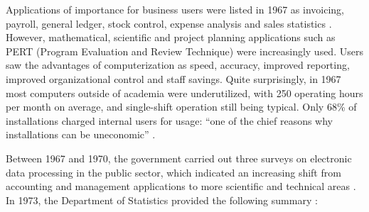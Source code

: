 \documentclass{IEEEcsmag}
\begin{document}
Applications of importance for business users were listed in 1967 as invoicing, payroll, general ledger, stock control, expense analysis and sales statistics \cite{ScottSurvey1967}. However, mathematical, scientific and project planning applications such as PERT (Program Evaluation and Review Technique) were increasingly used. Users saw the advantages of computerization as speed, accuracy, improved reporting, improved organizational control and staff savings. Quite surprisingly, in 1967 most computers outside of academia were underutilized, with 250 operating hours per month on average, and single-shift operation still being typical. Only 68\% of installations charged internal users for usage: “one of the chief reasons why installations can be uneconomic” \cite{ScottSurvey1967}.

Between 1967 and 1970, the government carried out three surveys on electronic data processing in the public sector, which indicated an increasing shift from accounting and management applications to more scientific and technical areas \cite{Lythgoe-1970}. 
In 1973, the Department of Statistics provided the following summary \cite{Yearbook73}:

\begin{quotation}
\end{quotation}

\end{document}
